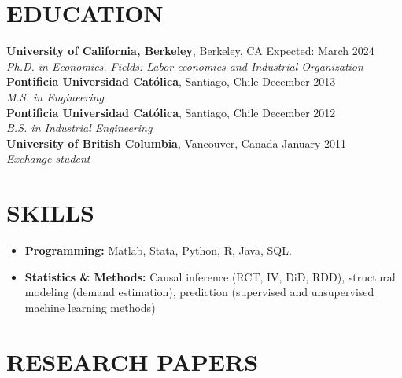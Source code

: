 \documentclass[letter,9pt]{extarticle}
\begin{document}
\section*{EDUCATION}
\textbf{University of California, Berkeley}, Berkeley, CA \hfill  Expected: March 2024\\ %
\textit{Ph.D. in Economics. Fields: Labor economics and Industrial Organization}\vspace{.1cm}\\ %
\textbf{Pontificia Universidad Católica}, Santiago, Chile \hfill  December 2013\\ %
\textit{M.S. in Engineering}\vspace{.1cm}\\   %
\textbf{Pontificia Universidad Católica}, Santiago, Chile \hfill  December 2012\\ %
\textit{B.S. in Industrial Engineering}\vspace{.1cm}\\   %
\textbf{University of British Columbia}, Vancouver, Canada \hfill  January 2011\\ %
\textit{Exchange student}   %

\section*{SKILLS}
\begin{itemize}
    \item \textbf{Programming:} Matlab, Stata, Python, R, Java, SQL.
    \item \textbf{Statistics \& Methods:} Causal inference (RCT, IV, DiD, RDD), structural modeling (demand estimation), prediction  (supervised and unsupervised machine learning methods)
\end{itemize}

\section*{RESEARCH PAPERS}
\end{document}
